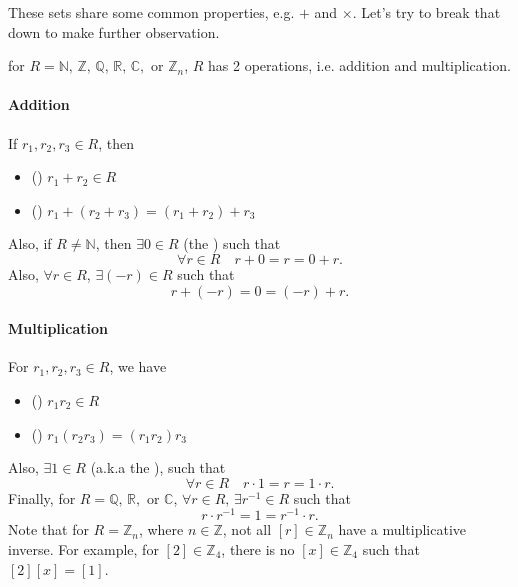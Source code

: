 \documentclass[notoc,notitlepage]{tufte-book}
\begin{document}
These sets share some common properties, e.g. $+$ and $\times$. Let's try to break that down to make further observation.

 for $R = \mathbb{N}, \, \mathbb{Z}, \, \mathbb{Q}, \, \mathbb{R}, \, \mathbb{C},$ or $\mathbb{Z}_n$, $R$ has 2 operations, i.e. addition and multiplication.

\paragraph{Addition} If $r_1, r_2, r_3 \in R$, then
\begin{itemize}
  \item () $r_1 + r_2 \in R$
  \item () $r_1 + (r_2 + r_3) = (r_1 + r_2) + r_3$
\end{itemize}
Also, if $R \neq \mathbb{N}$, then $\exists 0 \in R$ (the ) such that
\begin{equation*}
  \forall r \in R \quad r + 0 = r = 0 + r.
\end{equation*}
Also, $\forall r \in R$, $\exists (-r) \in R$ such that
\begin{equation*}
  r + (-r) = 0 = (-r) + r.
\end{equation*}

\paragraph{Multiplication} For $r_1, r_2, r_3 \in R$, we have
\begin{itemize}
  \item () $r_1 r_2 \in R$
  \item () $r_1 (r_2 r_3) = (r_1 r_2) r_3$
\end{itemize}
Also, $\exists 1 \in R$ (a.k.a the ), such that
\begin{equation*}
  \forall r \in R \quad r \cdot 1 = r = 1 \cdot r.
\end{equation*}
Finally, for $R = \mathbb{Q}, \, \mathbb{R},$ or $\mathbb{C}$, $\forall r \in R, \, \exists r^{-1} \in R$ such that
\begin{equation*}
  r \cdot r^{-1} = 1 = r^{-1} \cdot r.
\end{equation*}
Note that for $R = \mathbb{Z}_n$, where $n \in \mathbb{Z}$, not all $[r] \in \mathbb{Z}_n$ have a multiplicative inverse. For example, for $[2] \in \mathbb{Z}_4$, there is no $[x] \in \mathbb{Z}_4$ such that $[2][x] = [1]$.
\end{document}
